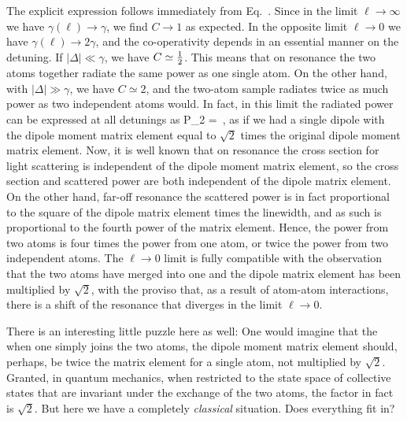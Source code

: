 The explicit expression follows immediately from Eq.~. Since in the limit $\ell\rightarrow\infty$ we have $\gamma(\ell)\rightarrow\gamma$, we find $C\rightarrow1$ as expected. In the opposite limit $\ell\rightarrow0$ we have $\gamma(\ell)\rightarrow 2\gamma$, and the co-operativity depends in an essential manner on the detuning. If $|\Delta|\ll\gamma$, we have $C\simeq{\hbox{$\frac{1}{2}$}}$. This means that on resonance the two atoms together radiate the same power as one single atom. On the other hand, with $|\Delta|\gg\gamma$, we have $C\simeq2$, and the two-atom sample radiates twice as much power as two independent atoms would. In fact, in this limit the radiated power can be expressed at all detunings as
\beq
P_2 = \,,
\eeq
as if we had a single dipole with the dipole moment matrix element equal to $\sqrt2$ times the original dipole moment matrix element. Now, it is well known that on resonance the cross section for light scattering is independent of the dipole moment matrix element, so the cross section and scattered power are both independent of the dipole matrix element. On the other hand, far-off resonance the scattered power is in fact proportional to the square of the dipole matrix element times the linewidth, and as such is proportional to the fourth power of the matrix element. Hence, the power from two atoms is four times the power from one atom, or twice the power from two independent atoms. The $\ell\rightarrow0$ limit is fully compatible with the observation that the two atoms have merged into one and the dipole matrix element has been multiplied by $\sqrt2$, with the proviso   that, as a result of atom-atom interactions, there is a shift of the resonance that diverges in the limit $\ell\rightarrow0$.

There is an interesting little puzzle here as well: One would imagine that the when one simply joins the two atoms, the dipole moment matrix element should, perhaps, be twice the matrix element for a single atom, not multiplied by $\sqrt 2$. Granted, in quantum mechanics, when restricted to the state space of collective states that are invariant under the exchange of the two atoms, the factor in fact is $\sqrt2$. But here we have a completely {\em classical\/} situation. Does everything fit in?

